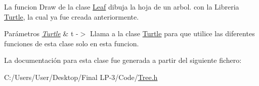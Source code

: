 La funcion Draw de la clase \mbox{\hyperlink{class_leaf}{Leaf}} dibuja la hoja de un arbol. con la Libreria \mbox{\hyperlink{class_turtle}{Turtle}}, la cual ya fue creada anteriormente.
\begin{DoxyParams}{Parámetros}
{\em \mbox{\hyperlink{class_turtle}{Turtle}}} & t -\/$>$ Llama a la clase \mbox{\hyperlink{class_turtle}{Turtle}} para que utilice las diferentes funciones de esta clase solo en esta funcion. \\
\hline
\end{DoxyParams}


La documentación para esta clase fue generada a partir del siguiente fichero\+:\begin{DoxyCompactItemize}
\item 
C\+:/\+Users/\+User/\+Desktop/\+Final L\+P-\/3/\+Code/\mbox{\hyperlink{_tree_8h}{Tree.\+h}}\end{DoxyCompactItemize}
